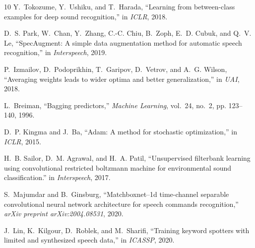 \documentclass[a4paper]{article}
\begin{document}
\begin{thebibliography}{10}
Y.~Tokozume, Y.~Ushiku, and T.~Harada, ``Learning from between-class examples
  for deep sound recognition,'' in \emph{ICLR}, 2018.

D.~S. Park, W.~Chan, Y.~Zhang, C.-C. Chiu, B.~Zoph, E.~D. Cubuk, and Q.~V. Le,
  ``{SpecAugment}: A simple data augmentation method for automatic speech
  recognition,'' in \emph{Interspeech}, 2019.

P.~Izmailov, D.~Podoprikhin, T.~Garipov, D.~Vetrov, and A.~G. Wilson,
  ``Averaging weights leads to wider optima and better generalization,'' in
  \emph{UAI}, 2018.

L.~Breiman, ``Bagging predictors,'' \emph{Machine Learning}, vol.~24, no.~2,
  pp. 123--140, 1996.

D.~P. Kingma and J.~Ba, ``Adam: A method for stochastic optimization,'' in
  \emph{ICLR}, 2015.

H.~B. Sailor, D.~M. Agrawal, and H.~A. Patil, ``Unsupervised filterbank
  learning using convolutional restricted boltzmann machine for environmental
  sound classification.'' in \emph{Interspeech}, 2017.

S.~Majumdar and B.~Ginsburg, ``Matchboxnet--1d time-channel separable
  convolutional neural network architecture for speech commands recognition,''
  \emph{arXiv preprint arXiv:2004.08531}, 2020.

J.~Lin, K.~Kilgour, D.~Roblek, and M.~Sharifi, ``Training keyword spotters with
  limited and synthesized speech data,'' in \emph{ICASSP}, 2020.

\end{thebibliography}
 
\end{document}
